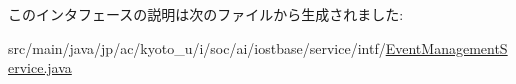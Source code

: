 このインタフェースの説明は次のファイルから生成されました\-:\begin{DoxyCompactItemize}
\item 
src/main/java/jp/ac/kyoto\-\_\-u/i/soc/ai/iostbase/service/intf/\hyperlink{_event_management_service_8java}{Event\-Management\-Service.\-java}\end{DoxyCompactItemize}
